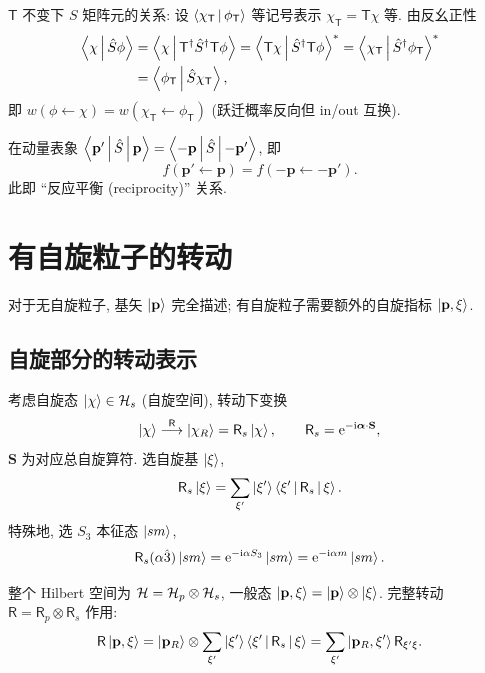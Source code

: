 $\mathsf{T}$ 不变下 $S$ 矩阵元的关系: 设 $\left\langle \chi_{\mathsf{T}} \,\middle|\, \phi_{\mathsf{T}} \right\rangle$ 等记号表示 $\chi_{\mathsf{T}}=\mathsf{T}\chi$ 等. 由反幺正性
\begin{align}
\left\langle \chi \,\middle|\, \hat{S}\phi \right\rangle&=\left\langle \chi \,\middle|\, \mathsf{T}^\dagger \hat{S}^\dagger \mathsf{T}\phi \right\rangle=\left\langle \mathsf{T}\chi \,\middle|\, \hat{S}^\dagger \mathsf{T}\phi \right\rangle^*=\left\langle \chi_{\mathsf{T}} \,\middle|\, \hat{S}^\dagger \phi_{\mathsf{T}} \right\rangle^*\nonumber\\
&=\left\langle \phi_{\mathsf{T}} \,\middle|\, \hat{S} \chi_{\mathsf{T}} \right\rangle,
\end{align}
即 $w(\phi\leftarrow \chi)=w(\chi_{\mathsf{T}}\leftarrow \phi_{\mathsf{T}})$ (跃迁概率反向但 in/out 互换).

在动量表象 $\left\langle \mathbf{p}' \,\middle|\, \hat{S} \,\middle|\, \mathbf{p} \right\rangle=\left\langle -\mathbf{p} \,\middle|\, \hat{S} \,\middle|\, -\mathbf{p}' \right\rangle$, 即
\begin{equation}\label{eq:T-amp}
f(\mathbf{p}'\leftarrow \mathbf{p})=f(-\mathbf{p}\leftarrow -\mathbf{p}').
\end{equation}
此即 ``反应平衡 (reciprocity)'' 关系.


\section{有自旋粒子的转动}\label{sec:spin-rotation}

对于无自旋粒子, 基矢 $\ket{\mathbf{p}}$ 完全描述; 有自旋粒子需要额外的自旋指标 $\ket{\mathbf{p},\xi}$.

\subsection{自旋部分的转动表示}

考虑自旋态 $\ket{\chi}\in \mathcal{H}_s$ (自旋空间), 转动下变换
\begin{equation}
\ket{\chi}\stackrel{\mathsf{R}}{\longrightarrow}\ket{\chi_R}=\mathsf{R}_s\ket{\chi},\qquad \mathsf{R}_s=\mathrm{e}^{-\mathrm{i} \bm{\alpha}\cdot \mathbf{S}},
\end{equation}
$\mathbf{S}$ 为对应总自旋算符. 选自旋基 $\ket{\xi}$,
\[
\mathsf{R}_s\ket{\xi}=\sum_{\xi'}\ket{\xi'}\left\langle \xi' \,\middle|\, \mathsf{R}_s \,\middle|\, \xi \right\rangle.
\]
特殊地, 选 $S_3$ 本征态 $\ket{sm}$,
\[
\mathsf{R}_s(\alpha\hat{3})\ket{sm}=\mathrm{e}^{-\mathrm{i} \alpha S_3}\ket{sm}=\mathrm{e}^{-\mathrm{i} \alpha m}\ket{sm}.
\]

整个 Hilbert 空间为 $\mathcal{H}=\mathcal{H}_p\otimes \mathcal{H}_s$, 一般态 $\ket{\mathbf{p},\xi}=\ket{\mathbf{p}}\otimes \ket{\xi}$. 完整转动 $\mathsf{R}=\mathsf{R}_p\otimes \mathsf{R}_s$ 作用:
\begin{equation}
\mathsf{R}\ket{\mathbf{p},\xi}=\ket{\mathbf{p}_R}\otimes \sum_{\xi'}\ket{\xi'}\left\langle \xi' \,\middle|\, \mathsf{R}_s \,\middle|\, \xi \right\rangle=\sum_{\xi'}\ket{\mathbf{p}_R,\xi'}\mathsf{R}_{\xi'\xi}.
\end{equation}

